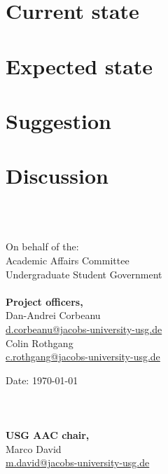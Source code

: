 \documentclass[a4paper,10pt]{article}
\makeatletter
\newcommand{\officer}[2]{#1\\\href{mailto:#2@jacobs-university-usg.de}{#2@jacobs-university-usg.de}}
\newcommand{\twoOfficer}[4]{\officer{#1}{#2}\\\officer{#3}{#4}}
\newcommand{\chair}{\officer{Marco David}{m.david}}
\makeatother
\begin{document}
	\maketitle
	\thispagestyle{main}
	\section{Current state}
		
	\section{Expected state}
		
  \section{Suggestion}
	  
  \section{Discussion}
	  
	  \ \\\ \\
  \begin{minipage}{0.5\textwidth}
  	\begin{flushleft}
  		On behalf of the:\\
  		Academic Affairs Committee\\
  		Undergraduate Student Government\\\ \\
  		\textbf{Project officers,}\\
  		\twoOfficer{Dan-Andrei Corbeanu}{d.corbeanu}{Colin Rothgang}{c.rothgang}
  	\end{flushleft}
  \end{minipage}
  \begin{minipage}{0.5\textwidth}
  	\begin{flushright}
  		Date: \today\\\ \\\ \\\ \\
  		\textbf{USG AAC chair,}\\
  		\chair\ \\\ \\\ \\
  	\end{flushright}
  \end{minipage}
	\label{theEnd}
\end{document}
